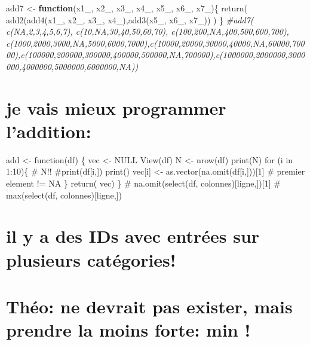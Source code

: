 \documentclass[
]{article}
\newenvironment{Shaded}{\begin{snugshade}}{\end{snugshade}}
\newcommand{\CommentTok}[1]{\textcolor[rgb]{0.56,0.35,0.01}{\textit{#1}}}
\newcommand{\ControlFlowTok}[1]{\textcolor[rgb]{0.13,0.29,0.53}{\textbf{#1}}}
\newcommand{\FunctionTok}[1]{\textcolor[rgb]{0.00,0.00,0.00}{#1}}
\newcommand{\NormalTok}[1]{#1}
\newcommand{\OtherTok}[1]{\textcolor[rgb]{0.56,0.35,0.01}{#1}}
\begin{document}
\begin{Shaded}
\begin{Highlighting}[]
\NormalTok{add7 }\OtherTok{\textless{}{-}} \ControlFlowTok{function}\NormalTok{(x1\_, x2\_, x3\_, x4\_, x5\_, x6\_, x7\_)\{}
  \FunctionTok{return}\NormalTok{( }\FunctionTok{add2}\NormalTok{(}\FunctionTok{add4}\NormalTok{(x1\_, x2\_, x3\_, x4\_),}\FunctionTok{add3}\NormalTok{(x5\_, x6\_, x7\_)) )}
\NormalTok{\}}
\CommentTok{\#add7( c(NA,2,3,4,5,6,7), c(10,NA,30,40,50,60,70), c(100,200,NA,400,500,600,700), c(1000,2000,3000,NA,5000,6000,7000),c(10000,20000,30000,40000,NA,60000,70000),c(100000,200000,300000,400000,500000,NA,700000),c(1000000,2000000,3000000,4000000,5000000,6000000,NA))}
\end{Highlighting}
\end{Shaded}

\hypertarget{je-vais-mieux-programmer-laddition}{%
\section{je vais mieux programmer
l'addition:}\label{je-vais-mieux-programmer-laddition}}

add \textless- function(df) \{ vec \textless- NULL View(df) N \textless-
nrow(df) print(N) for (i in 1:10)\{ \# N!! \#print(df{[}i,{]}) print()
vec{[}i{]} \textless- as.vector(na.omit(df{[}i,{]})){[}1{]} \# premier
element != NA \} return( vec) \} \# na.omit(select(df,
colonnes){[}ligne,{]}){[}1{]} \# max(select(df, colonnes){[}ligne,{]})

\hypertarget{il-y-a-des-ids-avec-entruxe9es-sur-plusieurs-catuxe9gories}{%
\section{il y a des IDs avec entrées sur plusieurs
catégories!}\label{il-y-a-des-ids-avec-entruxe9es-sur-plusieurs-catuxe9gories}}

\hypertarget{thuxe9o-ne-devrait-pas-exister-mais-prendre-la-moins-forte-min}{%
\section{Théo: ne devrait pas exister, mais prendre la moins forte: min
!}\label{thuxe9o-ne-devrait-pas-exister-mais-prendre-la-moins-forte-min}}
\end{document}
